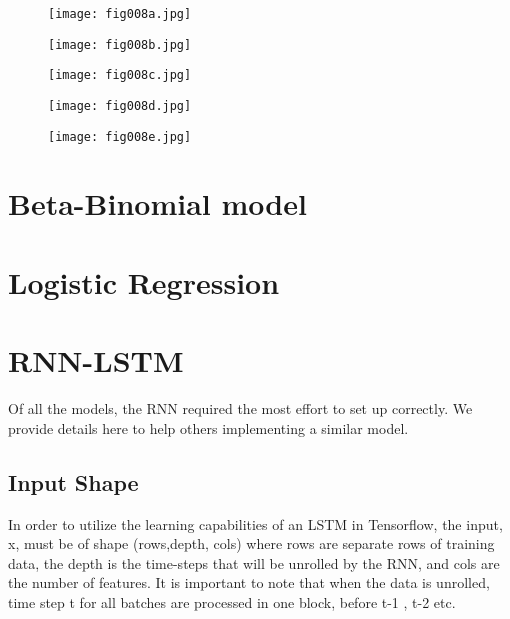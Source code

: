 \begin{figure}[h!]
	\centering
	\texttt{[image: fig008a.jpg]}
	\caption{}
	\label{fig:fig8a}
\end{figure} 

\begin{figure}[h!]
	\centering
	\texttt{[image: fig008b.jpg]}
	\caption{}
	\label{fig:fig8b}
\end{figure} 

\begin{figure}[h!]
	\centering
	\texttt{[image: fig008c.jpg]}
	\caption{}
	\label{fig:fig8c}
\end{figure} 

\begin{figure}[h!]
	\centering
	\texttt{[image: fig008d.jpg]}
	\caption{}
	\label{fig:fig8d}
\end{figure} 

\begin{figure}[h!]
	\centering
	\texttt{[image: fig008e.jpg]}
	\caption{}
	\label{fig:fig8e}
\end{figure} 

\section{Beta-Binomial model}

\section{Logistic Regression}

\section{RNN-LSTM}

Of all the models, the RNN required the most effort to set up correctly. We provide details here to help others implementing a similar model.

\subsection{Input Shape}

In order to utilize the learning capabilities of an LSTM in Tensorflow, the input, x, must be of shape (rows,depth, cols) where rows are separate rows of training data, the depth is the time-steps that will be unrolled by the RNN, and cols are the number of features. It is important to note that when the data is unrolled, time step t for all batches are processed in one block, before t-1 , t-2 etc.

